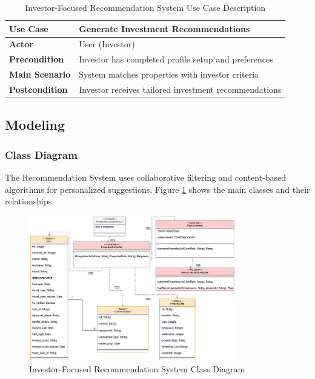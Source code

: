 \begin{table}[htbp]
    \centering
    \begin{tabular}{|p{3cm}|p{10cm}|}
        \hline
        \textbf{Use Case} & \textbf{Generate Investment Recommendations} \\
        \hline
        \textbf{Actor} & User (Investor) \\
        \hline
        \textbf{Precondition} & Investor has completed profile setup and preferences \\
        \hline
        \textbf{Main Scenario} & System matches properties with investor criteria \\
        \hline
        \textbf{Postcondition} & Investor receives tailored investment recommendations \\
        \hline
    \end{tabular}
    \caption{Investor-Focused Recommendation System Use Case Description}
    \label{tab:recommendation-use-case}
\end{table}

\subsection{Modeling}
\subsubsection{Class Diagram}
The Recommendation System uses collaborative filtering and content-based algorithms for personalized suggestions. Figure \ref{fig:recommendation-class-diagram} shows the main classes and their relationships.

\begin{figure}[htbp]
    \centering
    \includegraphics[width=0.8\textwidth]{images/recommendation_class_diagram.png}
    \caption{Investor-Focused Recommendation System Class Diagram}
    \label{fig:recommendation-class-diagram}
\end{figure}

